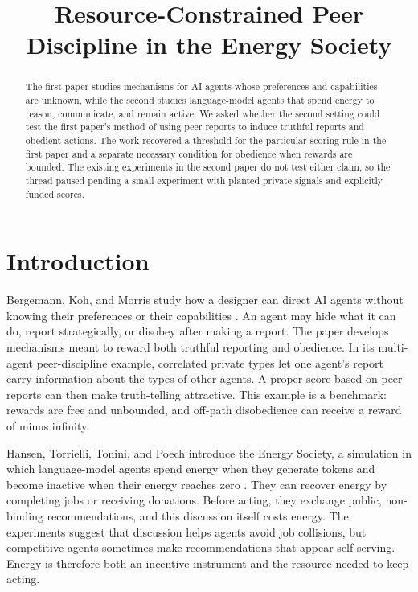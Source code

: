 \documentclass{article}
\title{Resource-Constrained Peer Discipline in the Energy Society}
\author{}
\date{}
\begin{document}
\maketitle

\begin{abstract}
The first paper studies mechanisms for AI agents whose preferences and capabilities are unknown, while the second studies language-model agents that spend energy to reason, communicate, and remain active.  We asked whether the second setting could test the first paper's method of using peer reports to induce truthful reports and obedient actions.  The work recovered a threshold for the particular scoring rule in the first paper and a separate necessary condition for obedience when rewards are bounded.  The existing experiments in the second paper do not test either claim, so the thread paused pending a small experiment with planted private signals and explicitly funded scores.
\end{abstract}

\section{Introduction}

Bergemann, Koh, and Morris study how a designer can direct AI agents without knowing their preferences or their capabilities \cite{Q}.  An agent may hide what it can do, report strategically, or disobey after making a report.  The paper develops mechanisms meant to reward both truthful reporting and obedience.  In its multi-agent peer-discipline example, correlated private types let one agent's report carry information about the types of other agents.  A proper score based on peer reports can then make truth-telling attractive.  This example is a benchmark: rewards are free and unbounded, and off-path disobedience can receive a reward of minus infinity.

Hansen, Torrielli, Tonini, and Poech introduce the Energy Society, a simulation in which language-model agents spend energy when they generate tokens and become inactive when their energy reaches zero \cite{P}.  They can recover energy by completing jobs or receiving donations.  Before acting, they exchange public, non-binding recommendations, and this discussion itself costs energy.  The experiments suggest that discussion helps agents avoid job collisions, but competitive agents sometimes make recommendations that appear self-serving.  Energy is therefore both an incentive instrument and the resource needed to keep acting.
\end{document}
